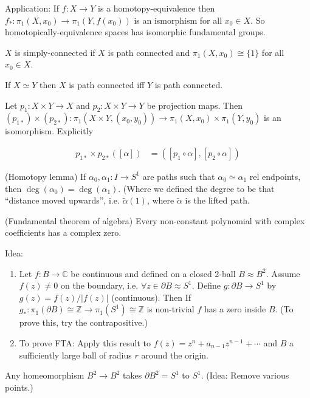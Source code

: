 Application: If $f:X\to Y$ is a homotopy-equivalence then $f_{*}:\pi_{1}(X,x_{0})\to\pi_{1}(Y,f(x_{0}))$
is an ismorphism for all $x_{0}\in X$. So homotopically-equivalence
spaces has isomorphic fundamental groups.
\begin{defn}
$X$ is simply-connected if $X$ is path connected and $\pi_{1}(X,x_{0})\cong\{1\}$
for all $x_{0}\in X$.\end{defn}
\begin{lem}
If $X\simeq Y$ then $X$ is path connected iff $Y$ is path connected.\end{lem}
\begin{thm}
Let $p_{1}:X\times Y\to X$ and $p_{2}:X\times Y\to Y$ be projection
maps. Then $(p_{1*})\times(p_{2*}):\pi_{1}(X\times Y,(x_{0},y_{0}))\to\pi_{1}(X,x_{0})\times\pi_{1}(Y,y_{0})$
is an isomorphism. Explicitly

\begin{align*}
p_{1*}\times p_{2*}([\alpha]) & =([p_{1}\circ\alpha],[p_{2}\circ\alpha])
\end{align*}
\end{thm}
\begin{lem}
(Homotopy lemma) If $\alpha_{0},\alpha_{1}:I\to S^{1}$ are paths
such that $\alpha_{0}\simeq\alpha_{1}$ rel endpoints, then $\deg(\alpha_{0})=\deg(\alpha_{1})$.
(Where we defined the degree to be that ``distance moved upwards'',
i.e. $\tilde{\alpha}(1)$, where $\tilde{\alpha}$ is the lifted path. \end{lem}
\begin{thm}
(Fundamental theorem of algebra) Every non-constant polynomial with
complex coefficients has a complex zero.

Idea:\end{thm}
\begin{enumerate}
\item Let $f:B\to\mathbb{C}$ be continuous and defined on a closed 2-ball
$B\approx B^{2}$. Assume $f(z)\neq0$ on the boundary, i.e. $\forall z\in\partial B\approx S^{1}$.
Define $g:\partial B\to S^{1}$ by $g(z)=f(z)/|f(z)|$ (continuous).
Then If $g_{*}:\pi_{1}(\partial B)\cong\mathbb{Z}\to\pi_{1}(S^{1})\cong\mathbb{Z}$
is non-trivial $f$ has a zero inside $B$. (To prove this, try the
contrapositive.)
\item To prove FTA: Apply this result to $f(z)=z^{n}+a_{n-1}z^{n-1}+\cdots$
and $B$ a sufficiently large ball of radius $r$ around the origin.\end{enumerate}
\begin{thm}
Any homeomorphism $B^{2}\to B^{2}$ takes $\partial B^{2}=S^{1}$
to $S^{1}$. (Idea: Remove various points.)
\end{thm}

